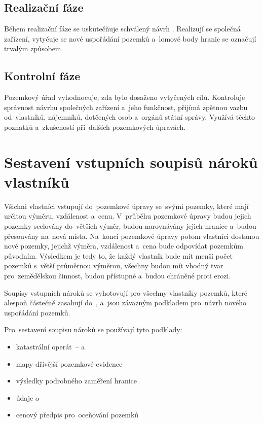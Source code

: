 \subsection{Realizační fáze}
\label{realizacni_faze}

Během realizační fáze se uskutečňuje schválený návrh
. Realizují se společná zařízení, vytyčuje se nové uspořádání
pozemků a~lomové body hranic se označují trvalým způsobem.

\subsection{Kontrolní fáze}
\label{kontrolni_faze}

Pozemkový úřad vyhodnocuje, zda bylo dosaženo vytyčených
cílů. Kontroluje správ\-nost návrhu společných zařízení a~jeho
funkčnost, přijímá zpětnou vazbu od~vlastníků, nájemníků, dotčených
osob a~orgánů státní správy. Využívá těchto poznatků a~zkušeností
při~dalších pozemkových úpravách.

\section{Sestavení vstupních soupisů nároků vlastníků}
\label{naroky}

Všichni vlastníci vstupují do~pozemkové úpravy se~svými pozemky, které
mají určitou výměru, vzdálenost a~cenu. V~průběhu pozemkové úpravy
budou jejich pozemky scelovány do~větších výměr, budou narovnávány
jejich hranice a~budou přesouvány na~nová místa. Na~konci pozemkové
úpravy potom vlastníci dostanou nové pozemky, jejichž výměra,
vzdálenost a~cena bude odpovídat pozemkům původním. Výsledkem je tedy
to, že každý vlastník bude mít menší počet pozemků s~větší průměrnou
výměrou, všechny budou mít vhodný tvar pro~zemědělskou činnost, budou
přístupné a~budou chráněné proti erozi.

Soupisy vstupních nároků se vyhotovují pro všechny vlastníky pozemků,
které alespoň částečně zasahují do~, a~jsou závazným
podkladem pro~návrh nového uspořádání pozemků.

Pro~sestavení soupisu nároků se používají tyto podklady:
\vspace{-\topsep}
	\begin{itemize}[leftmargin=1.5cm, noitemsep]
		\item katastrální operát~–  a~
		\item mapy dřívější pozemkové evidence
		\item výsledky podrobného zaměření hranice 
		\item údaje o~
		\item cenový předpis pro~oceňování pozemků
	\end{itemize}


